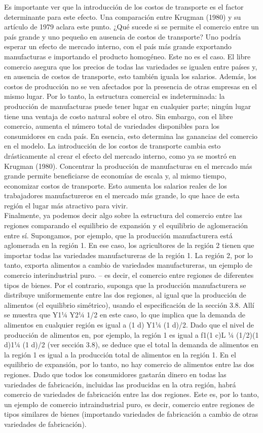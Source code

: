Es importante ver que la introducción de los costos de transporte es el factor determinante para este efecto. Una comparación entre Krugman (1980) y su artículo de 1979 aclara este punto. ¿Qué sucede si se permite el comercio entre un país grande y uno pequeño en ausencia de costos de transporte? Uno podría esperar un efecto de mercado interno, con el país más grande exportando manufacturas e importando el producto homogéneo. Este no es el caso. El libre comercio asegura que los precios de todas las variedades se igualen entre países y, en ausencia de costos de transporte, esto también iguala los salarios. Además, los costos de producción no se ven afectados por la presencia de otras empresas en el mismo lugar. Por lo tanto, la estructura comercial es indeterminada: la producción de manufacturas puede tener lugar en cualquier parte; ningún lugar tiene una ventaja de costo natural sobre el otro. Sin embargo, con el libre comercio, aumenta el número total de variedades disponibles para los consumidores en cada país. En esencia, esto determina las ganancias del comercio en el modelo. La introducción de los costos de transporte cambia esto drásticamente al crear el efecto del mercado interno, como ya se mostró en Krugman (1980). Concentrar la producción de manufacturas en el mercado más grande permite beneficiarse de economías de escala y, al mismo tiempo, economizar costos de transporte. Esto aumenta los salarios reales de los trabajadores manufactureros en el mercado más grande, lo que hace de esta región el lugar más atractivo para vivir.\\
Finalmente, ya podemos decir algo sobre la estructura del comercio entre las regiones comparando el equilibrio de expansión y el equilibrio de aglomeración entre sí. Supongamos, por ejemplo, que la producción manufacturera está aglomerada en la región 1. En ese caso, los agricultores de la región 2 tienen que importar todas las variedades manufactureras de la región 1. La región 2, por lo tanto, exporta alimentos a cambio de variedades manufactureras, un ejemplo de comercio interindustrial puro. – es decir, el comercio entre regiones de diferentes tipos de bienes. Por el contrario, suponga que la producción manufacturera se distribuye uniformemente entre las dos regiones, al igual que la producción de alimentos (el equilibrio simétrico), usando el especificación de la sección 3.8. Allí se muestra que Y1¼ Y2¼ 1/2 en este caso, lo que implica que la demanda de alimentos en cualquier región es igual a (1 d) Y1¼ (1 d)/2. Dado que el nivel de producción de alimentos en, por ejemplo, la región 1 es igual a f1(1 c)L ¼ (1/2)(1 d)1¼ (1 d)/2 (ver sección 3.8), se deduce que el total la demanda de alimentos en la región 1 es igual a la producción total de alimentos en la región 1. En el equilibrio de expansión, por lo tanto, no hay comercio de alimentos entre las dos regiones. Dado que todos los consumidores gastarán dinero en todas las variedades de fabricación, incluidas las producidas en la otra región, habrá comercio de variedades de fabricación entre las dos regiones. Este es, por lo tanto, un ejemplo de comercio intraindustrial puro, es decir, comercio entre regiones de tipos similares de bienes (importando variedades de fabricación a cambio de otras variedades de fabricación).



